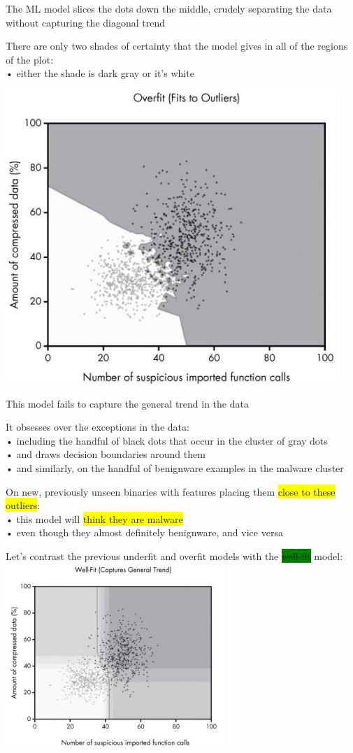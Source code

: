 \documentclass[]{project_plan}
\begin{document}
The ML model slices the dots down the middle, crudely
separating the data without capturing the diagonal trend

There are only two shades of certainty that the model gives in all of the regions of
the plot:\\
• either the shade is dark gray or it’s white

\includegraphics[width=.6\linewidth]{overfit ml.png}

This model fails to capture the general trend in the data

It obsesses over the exceptions in the data:\\
• including the handful of black dots that occur in the cluster of gray dots\\
• and draws decision boundaries around them\\
• and similarly, on the handful of benignware examples in the malware cluster

On new, previously unseen binaries with features placing them \colorbox{yellow}{close to these
  outliers}:\\
• this model will \colorbox{yellow}{think they are malware}\\
• even though they almost definitely benignware, and vice versa

Let’s contrast the previous underfit and overfit models with the \colorbox{green}{well-fit} model:\\
\includegraphics[width=.6\linewidth]{well fit.png}
\end{document}
